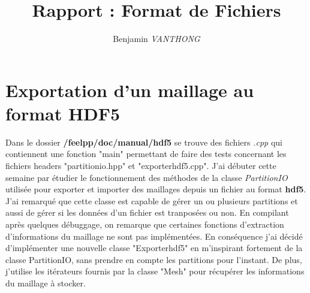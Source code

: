 \documentclass[12pt]{article}
\title {Rapport : Format de Fichiers}
\author {Benjamin \emph{VANTHONG}}
\begin{document}
\maketitle 
\section {Exportation d'un maillage au format HDF5}
Dans le dossier \textbf{/feelpp/doc/manual/hdf5} se trouve des fichiers \emph{.cpp} qui contiennent une fonction "main" permettant de faire des tests concernant les fichiers headers "partitionio.hpp" et "exporterhdf5.cpp".
J'ai débuter cette semaine par étudier le fonctionnement des méthodes de la classe \emph{PartitionIO} utilisée pour exporter et importer des maillages depuis un fichier au format \textbf{hdf5}. J'ai remarqué que cette classe est capable de gérer un ou plusieurs partitions et aussi de gérer si les données d'un fichier est tranposées ou non.
En compilant après quelques débuggage, on remarque que certaines fonctions d'extraction d'informations du maillage ne sont pas implémentées. 
En conséquence j'ai décidé d'implémenter une nouvelle classe "Exporterhdf5" en m'inspirant fortement de la classe PartitionIO, sans prendre en compte les partitions pour l'instant. De plus, j'utilise les itérateurs fournis par la classe "Mesh" pour récupérer les informations du maillage à stocker. \newline 
\end{document}
